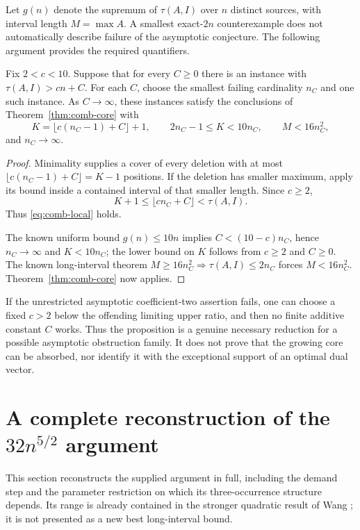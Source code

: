 Let $g(n)$ denote the supremum of $\tau(A,I)$ over $n$ distinct
sources, with interval length $M=\max A$. A smallest exact-$2n$
counterexample does not automatically describe failure of the
asymptotic conjecture. The following argument provides the required
quantifiers.

\begin{proposition}
\label{prop:comb-asym-minimality}
Fix $2<c<10$. Suppose that for every $C\ge0$ there is an instance
with $\tau(A,I)>cn+C$. For each $C$, choose the smallest failing
cardinality $n_C$ and one such instance. As $C\to\infty$, these
instances satisfy the conclusions of Theorem~\ref{thm:comb-core}
with
\[
 K=\lfloor c(n_C-1)+C\rfloor+1,
 \qquad 2n_C-1\le K<10n_C,
 \qquad M<16n_C^2,
\]
and $n_C\to\infty$.
\end{proposition}

\begin{proof}
Minimality supplies a cover of every deletion with at most
$\lfloor c(n_C-1)+C\rfloor=K-1$ positions. If the deletion has
smaller maximum, apply its bound inside a contained interval of
that smaller length. Since $c\ge2$,
\[
 K+1\le\lfloor cn_C+C\rfloor<\tau(A,I).
\]
Thus \eqref{eq:comb-local} holds.

The known uniform bound $g(n)\le10n$ \cite{Wang} implies
$C<(10-c)n_C$, hence $n_C\to\infty$ and $K<10n_C$; the lower
bound on $K$ follows from $c\ge2$ and $C\ge0$.
The known long-interval theorem
$M\ge16n_C^2\Rightarrow\tau(A,I)\le2n_C$ \cite{Wang}
forces $M<16n_C^2$. Theorem~\ref{thm:comb-core} now applies.
\end{proof}

If the unrestricted asymptotic coefficient-two assertion fails,
one can choose a fixed $c>2$ below the offending limiting upper
ratio, and then no finite additive constant $C$ works. Thus the
proposition is a genuine necessary reduction for a possible
asymptotic obstruction family. It does not prove that the growing
core can be absorbed, nor identify it with the exceptional support
of an optimal dual vector.

\section{A complete reconstruction of the \texorpdfstring{$32n^{5/2}$}{32 n to the five-halves} argument}
\label{sec:comb-dot}

This section reconstructs the supplied argument in full, including
the demand step and the parameter restriction on which its
three-occurrence structure depends. Its range is already contained
in the stronger quadratic result of Wang \cite{Wang}; it is not
presented as a new best long-interval bound.


